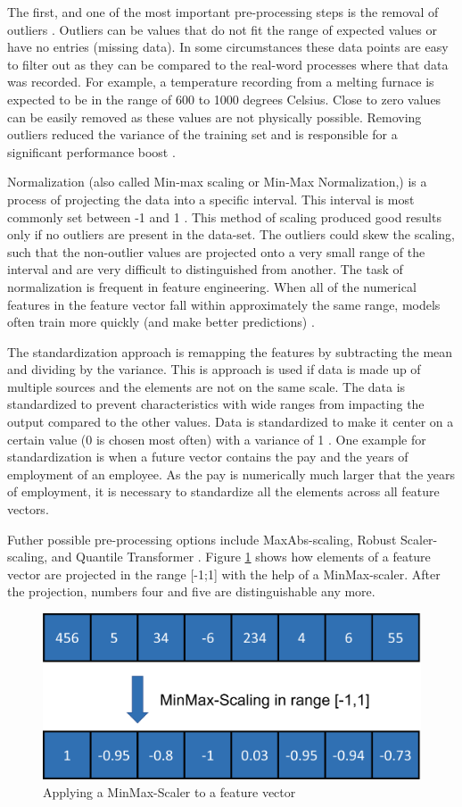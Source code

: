 The first, and one of the most important pre-processing steps is the removal of outliers \cite{Yang}. Outliers can be values that do not fit the range of expected values or have no entries (missing data). In some circumstances these data points are easy to filter out as they can be compared to the real-word processes where that data was recorded. For example, a temperature recording from a melting furnace is expected to be in the range of 600 to 1000 degrees Celsius. Close to zero values can be easily removed as these values are not physically possible. Removing outliers reduced the variance of the training set and is responsible for a significant performance boost \cite{Li}.

Normalization (also called Min-max scaling or Min-Max Normalization,) is a process of projecting the data into a specific interval. This interval is most commonly set between -1 and 1 \cite{Peshawa}. This method of scaling produced good results only if no outliers are present in the data-set. The outliers could skew the scaling, such that the non-outlier values are projected onto a very small range of the interval and are very difficult to distinguished from another. The task of normalization is frequent in feature engineering. When all of the numerical features in the feature vector fall within approximately the same range, models often train more quickly (and make better predictions) \cite{Jayalakshmi}.

The standardization approach is remapping the features by subtracting the mean and dividing by the variance. This is approach is used if data is made up of multiple sources and the elements are not on the same scale. The data is standardized to prevent characteristics with wide ranges from impacting the output compared to the other values. Data is standardized to make it center on a certain value (0 is chosen most often) with a variance of 1 \cite{Raju}.
One example for standardization is when a future vector contains the pay and the years of employment of an employee. As the pay is numerically much larger that the years of employment, it is necessary to standardize all the elements across all feature vectors.  

Futher possible pre-processing options include MaxAbs-scaling, Robust Scaler-scaling, and Quantile Transformer \cite{Ahsan}.
Figure \ref{fig:MM} shows how elements of a feature vector are projected in the range [-1;1] with the help of a MinMax-scaler. After the projection, numbers four and five are distinguishable any more. 
\begin{figure}[H]
	\centering
	\includegraphics[width=0.5\linewidth]{IMGs/MM.png}
	\caption{Applying a MinMax-Scaler to a feature vector}
	\label{fig:MM}
\end{figure}


